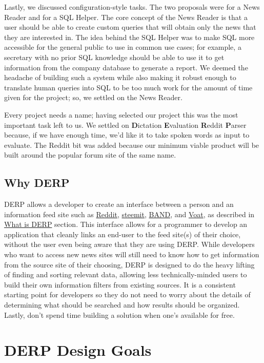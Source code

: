 \documentclass{article}
\begin{document}
Lastly, we discussed configuration-style tasks. The two proposals were for a News Reader and for a SQL Helper. The core concept of the News Reader is that a user should be able to create custom queries that will obtain only the news that they are interested in. The idea behind the SQL Helper was to make SQL more accessible for the general public to use in common use cases; for example, a secretary with no prior SQL knowledge should be able to use it to get information from the company database to generate a report. We deemed the headache of building such a system while also making it robust enough to translate human queries into SQL to be too much work for the amount of time given for the project; so, we settled on the News Reader.

Every project needs a name; having selected our project this was the most important task left to us. We settled on \textbf{D}ictation \textbf{E}valuation \textbf{R}eddit \textbf{P}arser because, if we have enough time, we'd like it to take spoken words as input to evaluate. The Reddit bit was added because our minimum viable product will be built around the popular forum site of the same name.


\subsection{Why DERP}
DERP allows a developer to create an interface between a person and an information feed site such as \href{https://www.reddit.com}{Reddit}, \href{https://steemit.com/}{steemit}, \href{https://band.us/home}{BAND}, and \href{https://voat.co/}{Voat}, as described in \hyperref[sec:whatisDERP]{What is DERP} section. This interface allows for a programmer to develop an application that cleanly links an end-user to the feed site(s) of their choice, without the user even being aware that they are using DERP. While developers who want to access new news sites will still need to know how to get information from the source site of their choosing, DERP is designed to do the heavy lifting of finding and sorting relevant data, allowing less technically-minded users to build their own information filters from existing sources. It is a consistent starting point for developers so they do not need to worry about the details of determining what should be searched and how results should be organized. Lastly, don't spend time building a solution when one's available for free.


\newpage
\section{DERP Design Goals}
\end{document}
